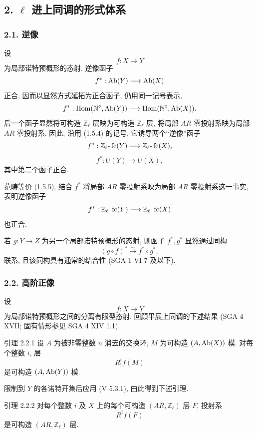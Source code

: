 \subsection*{2. \(\ell\) 进上同调的形式体系}

\subsubsection*{2.1. 逆像}

设
\[
f:X\longrightarrow Y
\]
为局部诺特预概形的态射. 逆像函子
\[
f^*:\operatorname{Ab}(Y)\longrightarrow \operatorname{Ab}(X)
\]
正合, 因而以显然方式延拓为正合函子, 仍用同一记号表示,
\[
f^*:\operatorname{Hom}(\mathbb N^\circ,\operatorname{Ab}(Y))\longrightarrow \operatorname{Hom}(\mathbb N^\circ,\operatorname{Ab}(X)).
\]
后一个函子显然将可构造 \(\mathbb Z_\ell\) 层映为可构造 \(\mathbb Z_\ell\) 层, 将局部 \(AR\) 零投射系映为局部 \(AR\) 零投射系. 因此, 沿用 (1.5.4) 的记号, 它诱导两个``逆像''函子
\[
f^*:\mathbb Z_\ell\text{-}\operatorname{fc}(Y)\longrightarrow \mathbb Z_\ell\text{-}\operatorname{fc}(X),
\]
\[
f^*:U(Y)\longrightarrow U(X),
\]
其中第二个函子正合.

范畴等价 (1.5.5), 结合 \(f^*\) 将局部 \(AR\) 零投射系映为局部 \(AR\) 零投射系这一事实, 表明逆像函子
\[
f^*:\mathbb Z_\ell\text{-}\operatorname{fc}(Y)\longrightarrow \mathbb Z_\ell\text{-}\operatorname{fc}(X)
\]
也正合.

若 \(g:Y\to Z\) 为另一个局部诺特预概形的态射, 则函子 \(f^*,g^*\) 显然通过同构
\[
(g\circ f)^*\xrightarrow{\sim}f^*\circ g^*,
\]
联系, 且该同构具有通常的结合性 (SGA 1 VI 7 及以下).

\subsubsection*{2.2. 高阶正像}

设
\[
f:X\longrightarrow Y
\]
为局部诺特预概形之间的分离有限型态射. 回顾平展上同调的下述结果 (SGA 4 XVII; 固有情形参见 SGA 4 XIV 1.1).

\begin{statement}{引理 2.2.1}
设 \(A\) 为被非零整数 \(n\) 消去的交换环, \(M\) 为可构造 \((A,\operatorname{Ab}(X))\) 模. 对每个整数 \(i\), 层
\[
R^i_!f(M)
\]
是可构造 \((A,\operatorname{Ab}(Y))\) 模.
\end{statement}

限制到 \(Y\) 的各诺特开集后应用 (V 5.3.1), 由此得到下述引理.

\begin{statement}{引理 2.2.2}
对每个整数 \(i\) 及 \(X\) 上的每个可构造 \((AR,\mathbb Z_\ell)\) 层 \(F\), 投射系
\[
R^i_!f(F)
\]
是可构造 \((AR,\mathbb Z_\ell)\) 层.
\end{statement}

